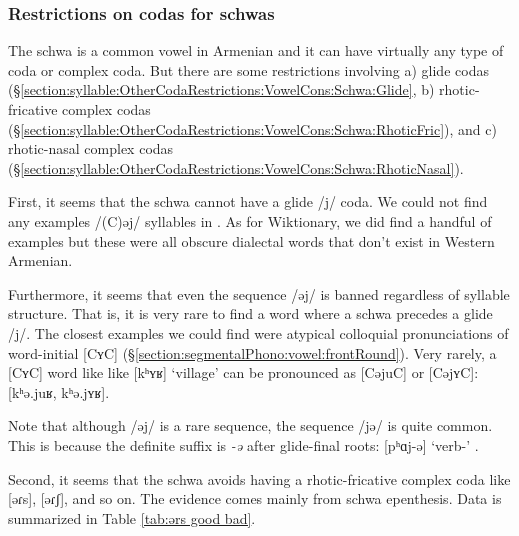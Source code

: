 	
	
	
	
	
	\subsubsection{Restrictions on codas for  schwas} \label{section:syllable:OtherCodaRestrictions:VowelCons:Schwa}
	
	The schwa is a common vowel in Armenian and it can have virtually any type of coda or complex coda. But there are some restrictions involving  a) glide codas (\S\ref{section:syllable:OtherCodaRestrictions:VowelCons:Schwa:Glide}, b) rhotic-fricative complex codas (\S\ref{section:syllable:OtherCodaRestrictions:VowelCons:Schwa:RhoticFric}), and c) rhotic-nasal complex codas (\S\ref{section:syllable:OtherCodaRestrictions:VowelCons:Schwa:RhoticNasal}).   
	
	
	
	 \label{section:syllable:OtherCodaRestrictions:VowelCons:Schwa:Glide}
	
	First, it seems that the schwa cannot have a glide /j/ coda. We could not find any examples /(C)əj/ syllables in \citeauthor{kouyoumdjian-1970-DictionaryArmenianEnglish}. As for Wiktionary, we did find a handful of examples but these were all obscure dialectal words that don't exist in Western Armenian. 
	
	Furthermore, it seems that even the sequence /əj/ is banned regardless of syllable structure. That is, it is very rare to find a word where a schwa precedes a glide /j/. The closest examples we could find were atypical colloquial pronunciations of word-initial [CʏC] (\S\ref{section:segmentalPhono:vowel:frontRound}).   Very rarely, a  [CʏC] word like like [kʰʏʁ] `village'   can be pronounced as [CəjuC] or [CəjʏC]: [kʰə.juʁ, kʰə.jʏʁ]. 
	
	Note that although /əj/ is a rare sequence, the sequence /jə/ is quite common. This is because the definite suffix is \textit{-ə} after glide-final roots: [pʰɑj-ə] `verb-{}' . 
	
	 \label{section:syllable:OtherCodaRestrictions:VowelCons:Schwa:RhoticFric}
	
	Second, it seems that the schwa avoids having a rhotic-fricative complex coda like [əɾs], [əɾʃ], and so on. The evidence comes mainly from schwa epenthesis.  Data is summarized in Table \ref{tab:ərs good bad}. 
	
